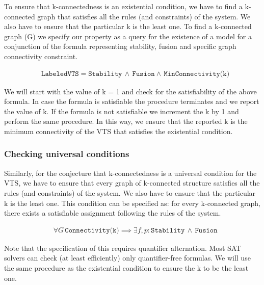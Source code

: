 To ensure that k-connectedness is an existential condition, we have to find a k-connected graph that satisfies all the rules (and constraints) of the system. 
%
We also have to ensure that the particular k is the least one. 
%
%
To find a k-connected graph (G) we specify our property as a query for the existence of a model for a conjunction of the formula representing stability, fusion and specific graph connectivity constraint. 
%

\begin{align*}
  &\texttt{LabeledVTS} = \texttt{Stability} \, \land \, \texttt{Fusion} \land \, \texttt{MinConnectivity(k)} 
\end{align*}

We will start with the value of k = 1 and check for the satisfiability of the above formula.
%
In case the formula is satisfiable the procedure terminates and we report the value of k. 
%
If the formula is not satisfiable we increment the k by 1 and perform the same procedure. 
%
In this way, we ensure that the reported k is the minimum connectivity of the VTS that satisfies the existential condition.  

\subsubsection{Checking universal conditions}

Similarly, for the conjecture that k-connectedness is a universal condition for the VTS, we have to ensure that every graph of k-connected structure satisfies all the rules (and constraints) of the system. 
%
We also have to ensure that the particular k is the least one. 
%
This condition can be specified as: for every k-connected graph, there exists a satisfiable assignment following the rules of the system. 

\begin{align*}
  & \forall G \, \texttt{Connectivity(k)} \implies  \exists
                        f,p: \texttt{Stability} \, \land \, \texttt{Fusion}  
\end{align*}

Note that the specification of this requires quantifier alternation. 
%
Most SAT solvers can check (at least efficiently) only quantifier-free formulas. 
%
We will use the same procedure as the existential condition to ensure the k to be the least one.



          
